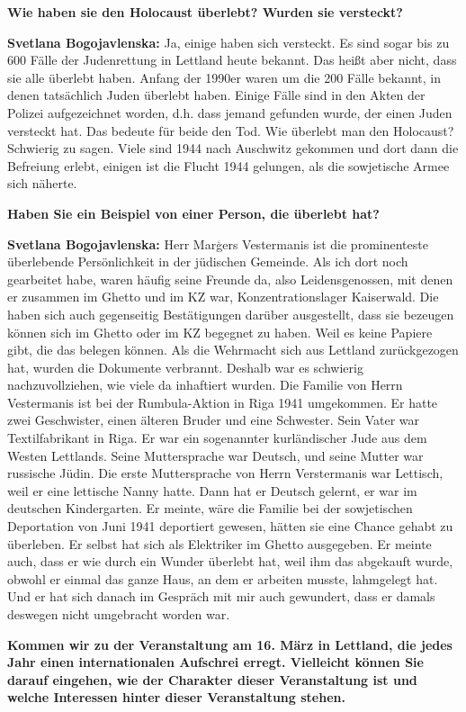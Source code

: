 \textbf{Wie haben sie den Holocaust überlebt? Wurden sie versteckt?}

\textbf{Svetlana Bogojavlenska:} Ja, einige haben sich versteckt. Es sind sogar bis zu 600 Fälle der Judenrettung in Lettland heute bekannt. Das heißt aber nicht, dass sie alle überlebt haben. Anfang der 1990er waren um die 200 Fälle bekannt, in denen tatsächlich Juden überlebt haben. Einige Fälle sind in den Akten der Polizei aufgezeichnet worden, d.h. dass jemand gefunden wurde, der einen Juden versteckt hat. Das bedeute für beide den Tod. Wie überlebt man den Holocaust? Schwierig zu sagen. Viele sind 1944 nach Auschwitz gekommen und dort dann die Befreiung erlebt, einigen ist die Flucht 1944 gelungen, als die sowjetische Armee sich näherte.

\textbf{Haben Sie ein Beispiel von einer Person, die überlebt hat?}

\textbf{Svetlana Bogojavlenska:}  Herr Marģers Vestermanis ist die prominenteste überlebende Persönlichkeit in der jüdischen Gemeinde. Als ich dort noch gearbeitet habe, waren häufig seine Freunde da, also Leidensgenossen, mit denen er zusammen im Ghetto und im KZ war, Konzentrationslager Kaiserwald. Die haben sich auch gegenseitig Bestätigungen darüber ausgestellt, dass sie bezeugen können sich im Ghetto oder im KZ begegnet zu haben. Weil es keine Papiere gibt, die das belegen können. Als die Wehrmacht sich aus Lettland zurückgezogen hat, wurden die Dokumente verbrannt. Deshalb war es schwierig nachzuvollziehen, wie viele da inhaftiert wurden. Die Familie von Herrn Vestermanis ist bei der Rumbula-Aktion in Riga 1941 umgekommen. Er hatte zwei Geschwister, einen älteren Bruder und eine Schwester. Sein Vater war Textilfabrikant in Riga. Er war ein sogenannter kurländischer Jude aus dem Westen Lettlands. Seine Muttersprache war Deutsch, und seine Mutter war russische Jüdin. Die erste Muttersprache von Herrn Verstermanis war Lettisch, weil er eine lettische Nanny hatte. Dann hat er Deutsch gelernt, er war im deutschen Kindergarten. Er meinte, wäre die Familie bei der sowjetischen Deportation von Juni 1941 deportiert gewesen, hätten sie eine Chance gehabt zu überleben. Er selbst hat sich als Elektriker im Ghetto ausgegeben. Er meinte auch, dass er wie durch ein Wunder überlebt hat, weil ihm das abgekauft wurde, obwohl er einmal das ganze Haus, an dem er arbeiten musste, lahmgelegt hat. Und er hat sich danach im Gespräch mit mir auch gewundert, dass er damals deswegen nicht umgebracht worden war.

\textbf{Kommen wir zu der Veranstaltung am 16. März in Lettland, die jedes Jahr einen internationalen Aufschrei erregt. Vielleicht können Sie darauf eingehen, wie der Charakter dieser Veranstaltung ist und welche Interessen hinter dieser Veranstaltung stehen.}

